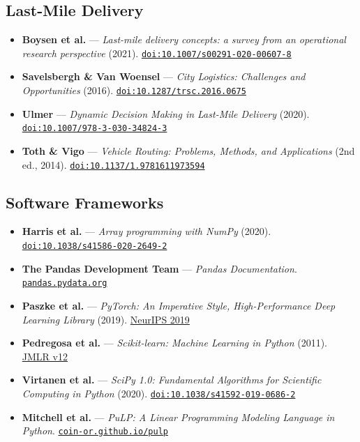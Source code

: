 \documentclass{article}
\begin{document}
\subsection*{Last-Mile Delivery}
\begin{itemize}
    \item \textbf{Boysen et al.} --- \textit{Last-mile delivery concepts: a survey from an operational research perspective} (2021). \href{https://doi.org/10.1007/s00291-020-00607-8}{\nolinkurl{doi:10.1007/s00291-020-00607-8}}
    \item \textbf{Savelsbergh \& Van Woensel} --- \textit{City Logistics: Challenges and Opportunities} (2016). \href{https://doi.org/10.1287/trsc.2016.0675}{\nolinkurl{doi:10.1287/trsc.2016.0675}}
    \item \textbf{Ulmer} --- \textit{Dynamic Decision Making in Last-Mile Delivery} (2020). \href{https://doi.org/10.1007/978-3-030-34824-3}{\nolinkurl{doi:10.1007/978-3-030-34824-3}}
    \item \textbf{Toth \& Vigo} --- \textit{Vehicle Routing: Problems, Methods, and Applications} (2nd ed., 2014). \href{https://doi.org/10.1137/1.9781611973594}{\nolinkurl{doi:10.1137/1.9781611973594}}
\end{itemize}

\subsection*{Software Frameworks}
\begin{itemize}
    \item \textbf{Harris et al.} --- \textit{Array programming with NumPy} (2020). \href{https://doi.org/10.1038/s41586-020-2649-2}{\nolinkurl{doi:10.1038/s41586-020-2649-2}}
    \item \textbf{The Pandas Development Team} --- \textit{Pandas Documentation}. \href{https://pandas.pydata.org/}{\nolinkurl{pandas.pydata.org}}
    \item \textbf{Paszke et al.} --- \textit{PyTorch: An Imperative Style, High-Performance Deep Learning Library} (2019). \href{https://proceedings.neurips.cc/paper/2019/hash/bdb106a070e5b8f8a47d77f06e54613a-Abstract.html}{NeurIPS 2019}
    \item \textbf{Pedregosa et al.} --- \textit{Scikit-learn: Machine Learning in Python} (2011). \href{https://www.jmlr.org/papers/v12/pedregosa11a.html}{JMLR v12}
    \item \textbf{Virtanen et al.} --- \textit{SciPy 1.0: Fundamental Algorithms for Scientific Computing in Python} (2020). \href{https://doi.org/10.1038/s41592-019-0686-2}{\nolinkurl{doi:10.1038/s41592-019-0686-2}}
    \item \textbf{Mitchell et al.} --- \textit{PuLP: A Linear Programming Modeling Language in Python}. \href{https://coin-or.github.io/pulp/}{\nolinkurl{coin-or.github.io/pulp}}
\end{itemize}
\end{document}
